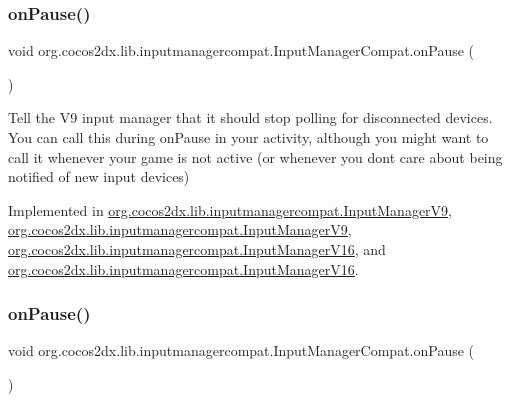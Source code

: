 \subsubsection{\texorpdfstring{on\+Pause()}{onPause()}\hspace{0.1cm}{\footnotesize\ttfamily [1/2]}}
{\footnotesize\ttfamily void org.\+cocos2dx.\+lib.\+inputmanagercompat.\+Input\+Manager\+Compat.\+on\+Pause (\begin{DoxyParamCaption}{ }\end{DoxyParamCaption})}

Tell the V9 input manager that it should stop polling for disconnected devices. You can call this during on\+Pause in your activity, although you might want to call it whenever your game is not active (or whenever you don\textquotesingle{}t care about being notified of new input devices) 

Implemented in \hyperlink{classorg_1_1cocos2dx_1_1lib_1_1inputmanagercompat_1_1InputManagerV9_ab80665476c8b79b16cbea8b2679effc6}{org.\+cocos2dx.\+lib.\+inputmanagercompat.\+Input\+Manager\+V9}, \hyperlink{classorg_1_1cocos2dx_1_1lib_1_1inputmanagercompat_1_1InputManagerV9_ab80665476c8b79b16cbea8b2679effc6}{org.\+cocos2dx.\+lib.\+inputmanagercompat.\+Input\+Manager\+V9}, \hyperlink{classorg_1_1cocos2dx_1_1lib_1_1inputmanagercompat_1_1InputManagerV16_a06c3db7d607a8a43c9d27565dd759340}{org.\+cocos2dx.\+lib.\+inputmanagercompat.\+Input\+Manager\+V16}, and \hyperlink{classorg_1_1cocos2dx_1_1lib_1_1inputmanagercompat_1_1InputManagerV16_a06c3db7d607a8a43c9d27565dd759340}{org.\+cocos2dx.\+lib.\+inputmanagercompat.\+Input\+Manager\+V16}.

\mbox{\label{interfaceorg_1_1cocos2dx_1_1lib_1_1inputmanagercompat_1_1InputManagerCompat_a75e607a2bc756ca935665236f995dd0e}} 
\subsubsection{\texorpdfstring{on\+Pause()}{onPause()}\hspace{0.1cm}{\footnotesize\ttfamily [2/2]}}
{\footnotesize\ttfamily void org.\+cocos2dx.\+lib.\+inputmanagercompat.\+Input\+Manager\+Compat.\+on\+Pause (\begin{DoxyParamCaption}{ }\end{DoxyParamCaption})}

